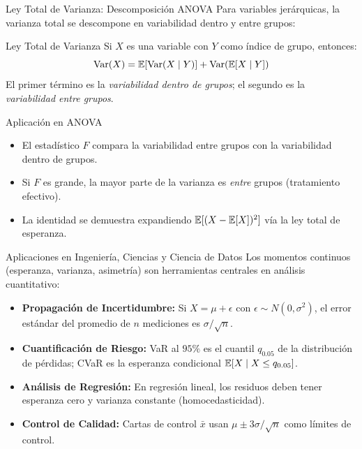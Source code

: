 \documentclass[10pt, aspectratio=169]{beamer}
\begin{document}
\begin{frame}{Ley Total de Varianza: Descomposición ANOVA}
  \footnotesize
  Para variables jerárquicas, la varianza total se descompone en variabilidad dentro y entre grupos: \pause

  \vspace{0.1cm}
  \begin{block}{Ley Total de Varianza}
    Si $X$ es una variable con $Y$ como índice de grupo, entonces:
    $$\operatorname{Var}(X) = \mathbb{E}[\operatorname{Var}(X \mid Y)] + \operatorname{Var}(\mathbb{E}[X \mid Y])$$
    El primer término es la \emph{variabilidad dentro de grupos}; el segundo es la \emph{variabilidad entre grupos}.
  \end{block}

  \vspace{0.1cm}
  \pause
  \begin{alertblock}{Aplicación en ANOVA}
    \begin{itemize}\itemsep=0.05cm
      \item El estadístico $F$ compara la variabilidad entre grupos con la variabilidad dentro de grupos.
      \item Si $F$ es grande, la mayor parte de la varianza es \emph{entre} grupos (tratamiento efectivo).
      \item La identidad se demuestra expandiendo $\mathbb{E}[(X - \mathbb{E}[X])^{2}]$ vía la ley total de esperanza.
    \end{itemize}
  \end{alertblock}
\end{frame}

\begin{frame}{Aplicaciones en Ingeniería, Ciencias y Ciencia de Datos}
  \footnotesize
  Los momentos continuos (esperanza, varianza, asimetría) son herramientas centrales en análisis cuantitativo: \pause

  \vspace{0.15cm}
  \begin{itemize}\itemsep=0.12cm
    \item \textbf{Propagación de Incertidumbre:} Si $X = \mu + \epsilon$ con $\epsilon \sim N(0, \sigma^{2})$, el error estándar del promedio de $n$ mediciones es $\sigma/\sqrt{n}$. \pause
    \item \textbf{Cuantificación de Riesgo:} VaR al $95\%$ es el cuantil $q_{0.05}$ de la distribución de pérdidas; CVaR es la esperanza condicional $\mathbb{E}[X \mid X \le q_{0.05}]$. \pause
    \item \textbf{Análisis de Regresión:} En regresión lineal, los residuos deben tener esperanza cero y varianza constante (homocedasticidad). \pause
    \item \textbf{Control de Calidad:} Cartas de control $\bar{x}$ usan $\mu \pm 3\sigma/\sqrt{n}$ como límites de control.
  \end{itemize}
\end{frame}
\end{document}

